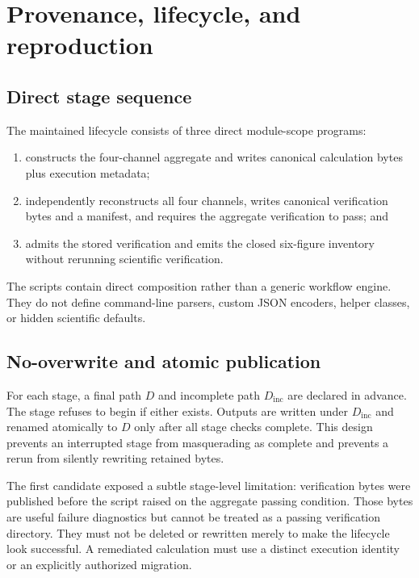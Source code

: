 \section{Provenance, lifecycle, and reproduction}

\subsection{Direct stage sequence}

The maintained lifecycle consists of three direct module-scope programs:
\begin{enumerate}
 \item {} constructs the four-channel aggregate and writes
       canonical calculation bytes plus execution metadata;
 \item {} independently reconstructs all four channels,
       writes canonical verification bytes and a manifest, and requires the aggregate
       verification to pass; and
 \item {} admits the stored verification and emits the closed
       six-figure inventory without rerunning scientific verification.
\end{enumerate}
The scripts contain direct composition rather than a generic workflow engine.  They do
not define command-line parsers, custom JSON encoders, helper classes, or hidden
scientific defaults.

\subsection{No-overwrite and atomic publication}

For each stage, a final path $D$ and incomplete path $D_{\mathrm{inc}}$ are declared in
advance.  The stage refuses to begin if either exists.  Outputs are written under
$D_{\mathrm{inc}}$ and renamed atomically to $D$ only after all stage checks complete.
This design prevents an interrupted stage from masquerading as complete and prevents a
rerun from silently rewriting retained bytes.

The first candidate exposed a subtle stage-level limitation: verification bytes were
published before the script raised on the aggregate passing condition.  Those bytes are
useful failure diagnostics but cannot be treated as a passing verification directory.
They must not be deleted or rewritten merely to make the lifecycle look successful.  A
remediated calculation must use a distinct execution identity or an explicitly authorized
migration.

